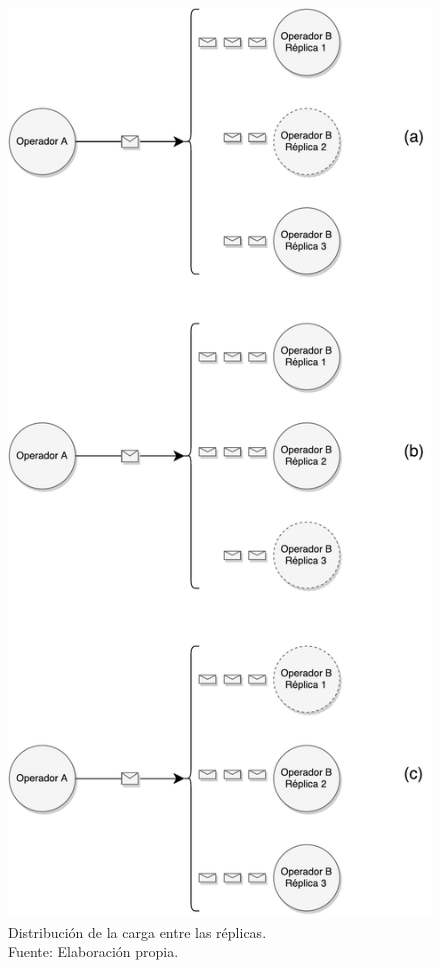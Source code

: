 \begin{figure}[!ht]
	\centering
	\captionsetup{justification=centering}
	\includegraphics[scale=0.4]{images/DistribucionCarga.pdf}
	\caption[Distribuci\'on de la carga entre las r\'eplicas.]{Distribuci\'on de la carga entre las r\'eplicas.\\Fuente: Elaboraci\'on propia.}
	\label{fig:distCarga}
\end{figure}


